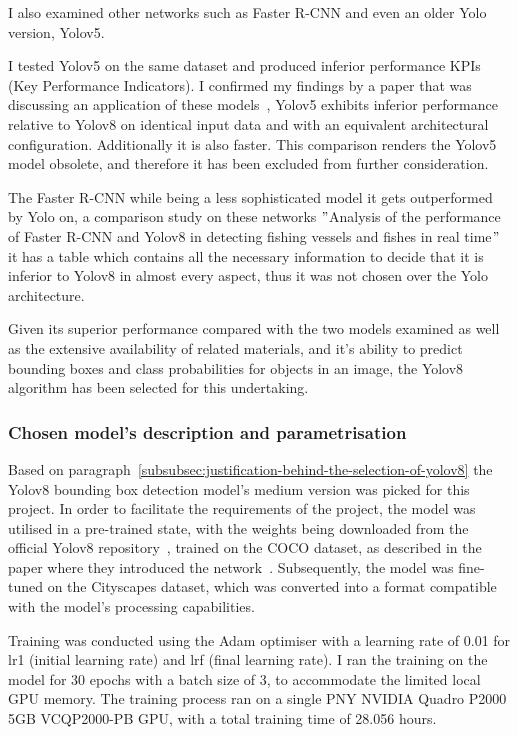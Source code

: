 I also examined other networks such as Faster R-CNN and even an older Yolo version, Yolov5.

I tested Yolov5 on the same dataset and produced inferior performance KPIs (Key Performance Indicators).
I confirmed my findings by a paper that was discussing an application of these models~\cite{Chitraningrum_Banowati_Herdiana_Mulyati_Sakti_Fudholi_Saputra_Farishi_Muchtar_Andria_2024},
Yolov5 exhibits inferior performance relative to Yolov8 on identical input data and with an equivalent architectural configuration.
Additionally it is also faster.
This comparison renders the Yolov5 model obsolete, and therefore it has been excluded from further consideration.

The Faster R-CNN while being a less sophisticated model it gets outperformed by Yolo on,
a comparison study on these networks \("\)Analysis of the performance of Faster R-CNN and Yolov8 in detecting fishing vessels and fishes in real time\("\)~\cite{ezzeddini2024fishing}
it has a table which contains all the necessary information to decide that it is inferior to Yolov8 in almost every aspect, thus it was not chosen over the Yolo architecture.

Given its superior performance compared with the two models examined
as well as the extensive availability of related materials, and it's ability to predict bounding boxes and class
probabilities for objects in an image, the Yolov8 algorithm has been selected for this undertaking.

\subsubsection{Chosen model's description and parametrisation}\label{subsubsec:model-architecture}

Based on paragraph~\ref{subsubsec:justification-behind-the-selection-of-yolov8} the Yolov8 bounding box
detection model's medium version was picked for this project.
In order to facilitate the requirements of the project, the model was utilised in a pre-trained state,
with the weights being downloaded from the official Yolov8 repository~\cite{githubGitHubUltralyticsultralytics}, trained on the COCO dataset, as described in the paper where they introduced the network~\cite{redmon2016lookonceunifiedrealtime}.
Subsequently, the model was fine-tuned on the Cityscapes dataset, which was converted into a format compatible with the model's processing capabilities.

Training was conducted using the Adam optimiser with a learning rate of 0.01 for lr1 (initial learning rate) and lrf (final learning rate).
I ran the training on the model for 30 epochs with a batch size of 3, to accommodate the limited local GPU memory.
The training process ran on a single PNY NVIDIA Quadro P2000 5GB VCQP2000-PB GPU, with a total training time of 28.056 hours.

